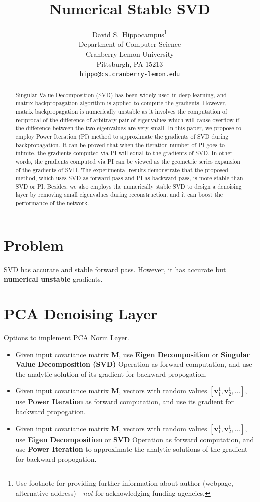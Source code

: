 \documentclass{article}
\title{Numerical Stable SVD}
\author{%
  David S.~Hippocampus\thanks{Use footnote for providing further information
    about author (webpage, alternative address)---\emph{not} for acknowledging
    funding agencies.} \\
  Department of Computer Science\\
  Cranberry-Lemon University\\
  Pittsburgh, PA 15213 \\
  \texttt{hippo@cs.cranberry-lemon.edu} \\
}
\newcommand{\bM}{\mathbf{M}}
\newcommand{\bv}{\mathbf{v}}
\begin{document}
\maketitle

\begin{abstract}
Singular Value Decomposition (SVD) has been widely used in deep learning, and matrix backpropagation algorithm is applied to compute the gradients. However, matrix backpropagation is numerically unstable as it involves the computation of reciprocal of the difference of arbitrary pair of eigenvalues which will cause overflow if the difference between the two eigenvalues are very small. In this paper, we propose to employ Power Iteration (PI) method to approximate the gradients of SVD during backpropagation. It can be proved that when the iteration number of PI goes to infinite, the gradients computed via PI will equal to the gradients of SVD. In other words, the gradients computed via PI can be viewed as the geometric series expansion of the gradients of SVD. The experimental results demonstrate that the proposed method, which uses SVD as forward pass and PI as backward pass, is more stable than SVD or PI. Besides, we also employs the numerically stable SVD to design a denoising layer by removing small eigenvalues during reconstruction, and it can boost the performance of the network.
\end{abstract}

\section{Problem}
SVD has accurate and stable forward pass. However, it has accurate but \textbf{numerical unstable} gradients.

\section{PCA Denoising Layer}
Options to implement PCA Norm Layer.
\begin{itemize}
\item Given input covariance matrix $\bM$, use \textbf{Eigen Decomposition} or \textbf{Singular Value Decomposition (SVD)} Operation as forward computation, and use the analytic solution of its gradient for backward propogation.
\item Given input covariance matrix $\bM$, vectors with random values $[\bv_1^{1}, \bv_2^{1}, ...]$, use \textbf{Power Iteration} as forward computation, and use its gradient for backward propogation.
\item Given input covariance matrix $\bM$, vectors with random values $[\bv_1^{1}, \bv_2^{1}, ...]$, use \textbf{Eigen Decomposition} or \textbf{SVD} Operation as forward computation, and use \textbf{Power Iteration} to approximate the analytic solutions of the gradient for backward propogation.
\end{itemize}
\end{document}
